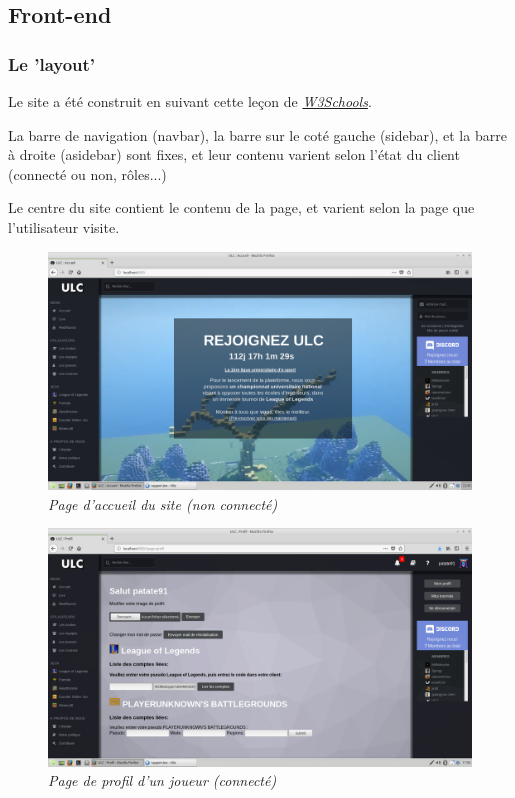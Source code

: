 \documentclass[10pt]{article}
\begin{document}
     \newpage
    \subsection{Front-end}
      \subsubsection{Le 'layout'}
	Le site a été construit en suivant cette leçon de \href{https://www.w3schools.com/css/css_website_layout.asp}{\textit{W3Schools}}.
	
	La barre de navigation (navbar), la barre sur le coté gauche (sidebar), et la barre à droite (asidebar) sont fixes,
	et leur contenu varient selon l'état du client (connecté ou non, rôles...)
	
	Le centre du site contient le contenu de la page, et varient selon la page que l'utilisateur visite.
	
	\begin{figure}[H]
	  \begin{center}
	    \includegraphics[width=12cm,keepaspectratio]{./images/site.png}
	  \end{center}
	  \caption{\textit{Page d'accueil du site (non connecté)}}
	  \label{site}
	\end{figure}
	
	\begin{figure}[H]
	  \begin{center}
	    \includegraphics[width=12cm,keepaspectratio]{./images/profil.png}
	  \end{center}
	  \caption{\textit{Page de profil d'un joueur (connecté)}}
	  \label{profil}
	\end{figure}
      
\end{document}
